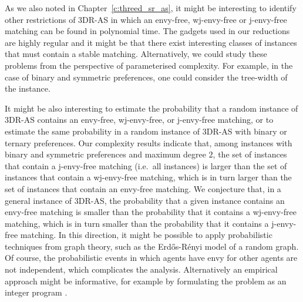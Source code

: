 
As we also noted in Chapter~\ref{c:threed_sr_as}, it might be interesting to identify other restrictions of 3DR-AS in which an envy-free, wj-envy-free or j-envy-free matching can be found in polynomial time. The gadgets used in our reductions are highly regular and it might be that there exist interesting classes of instances that must contain a stable matching. Alternatively, we could study these problems from the perspective of parameterised complexity. For example, in the case of binary and symmetric preferences, one could consider the tree-width \cite{Robertson84} of the instance.

It might be also interesting to estimate the probability that a random instance of 3DR-AS contains an envy-free, wj-envy-free, or j-envy-free matching, or to estimate the same probability in a random instance of 3DR-AS with binary or ternary preferences. Our complexity results indicate that, among instances with binary and symmetric preferences and maximum degree $2$, the set of instances that contain a j-envy-free matching (i.e.\ all instances) is larger than the set of instances that contain a wj-envy-free matching, which is in turn larger than the set of instances that contain an envy-free matching. We conjecture that, in a general instance of 3DR-AS, the probability that a given instance contains an envy-free matching is smaller than the probability that it contains a wj-envy-free matching, which is in turn smaller than the probability that it contains a j-envy-free matching. 
In this direction, it might be possible to apply probabilistic techniques from graph theory, such as the Erd\H{o}s-R\'enyi model of a random graph. Of course, the probabilistic events in which agents have envy for other agents are not independent, which complicates the analysis. Alternatively an empirical approach might be informative, for example by formulating the problem as an integer program \cite{IPbook}.


